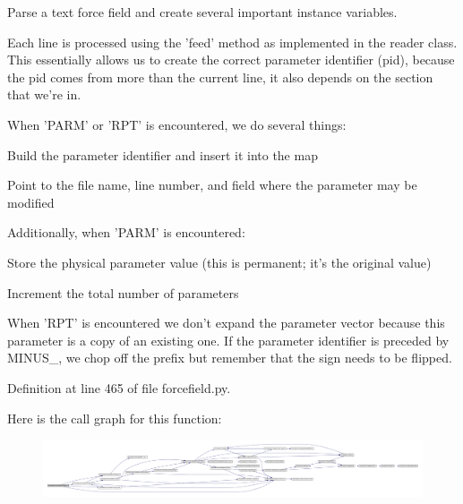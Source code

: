 \-Parse a text force field and create several important instance variables. 

\-Each line is processed using the 'feed' method as implemented in the reader class. \-This essentially allows us to create the correct parameter identifier (pid), because the pid comes from more than the current line, it also depends on the section that we're in.

\-When '\-P\-A\-R\-M' or '\-R\-P\-T' is encountered, we do several things\-:
\begin{DoxyItemize}
\item \-Build the parameter identifier and insert it into the map
\item \-Point to the file name, line number, and field where the parameter may be modified
\end{DoxyItemize}

\-Additionally, when '\-P\-A\-R\-M' is encountered\-:
\begin{DoxyItemize}
\item \-Store the physical parameter value (this is permanent; it's the original value)
\item \-Increment the total number of parameters
\end{DoxyItemize}

\-When '\-R\-P\-T' is encountered we don't expand the parameter vector because this parameter is a copy of an existing one. \-If the parameter identifier is preceded by \-M\-I\-N\-U\-S\-\_\-, we chop off the prefix but remember that the sign needs to be flipped. 

\-Definition at line 465 of file forcefield.\-py.



\-Here is the call graph for this function\-:\nopagebreak
\begin{figure}[H]
\begin{center}
\leavevmode
\includegraphics[width=350pt]{classforcebalance_1_1forcefield_1_1FF_ab4b5d5b79c89ab618ae968348bdfda3a_cgraph}
\end{center}
\end{figure}


